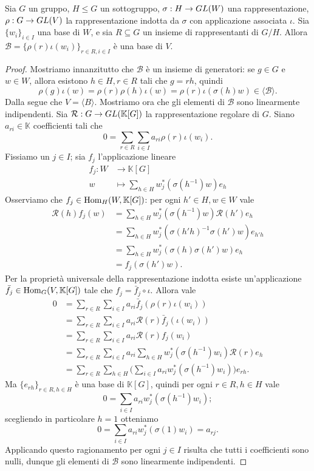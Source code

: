 \begin{proposition}
Sia $G$ un gruppo, $H\le G$ un sottogruppo, $\sigma:H\to GL(W)$ una rappresentazione, $\rho:G\to GL(V)$ la rappresentazione indotta da $\sigma$ con applicazione associata $\iota$. Sia $\{w_i\}_{i\in I}$ una base di $W$, e sia $R\subseteq G$ un insieme di rappresentanti di $G/H$. Allora $\mathcal{B}=\{\rho(r)\iota(w_i)\}_{r\in R,i\in I}$ è una base di $V$.
\end{proposition}
\begin{proof}
Mostriamo innanzitutto che $\mathcal{B}$ è un insieme di generatori: se $g\in G$ e $w\in W$, allora esistono $h\in H\comma r\in R$ tali che $g=rh$, quindi 
$$
\rho(g)\iota(w)=\rho(r)\rho(h)\iota(w)=\rho(r)\iota(\sigma(h)w)\in\langle\mathcal{B}\rangle.
$$
Dalla  segue che $V=\langle B\rangle$. Mostriamo ora che gli elementi di $\mathcal{B}$ sono linearmente indipendenti. Sia $\mathcal{R}:G\to GL(\mathbb{K}[G])$ la rappresentazione regolare di $G$. Siano $a_{ri}\in\mathbb{K}$ coefficienti tali che
$$
0=\sum_{r\in R}\sum_{i\in I}a_{ri}\rho(r)\iota(w_i).
$$
Fissiamo un $j\in I$; sia $f_j$ l'applicazione lineare
\begin{align*}
f_j:W&\longrightarrow\mathbb{K}[G]\\
w&\longmapsto\sum_{h\in H}w_j^*(\sigma(h^{-1})w)e_h
\end{align*}
Osserviamo che $f_j\in\operatorname{Hom}_H(W,\mathbb{K}[G])$: per ogni $h'\in H\comma w\in W$ vale
\begin{align*}
\mathcal{R}(h)f_j(w)&=\sum_{h\in H}w_j^*(\sigma(h^{-1})w)\mathcal{R}(h')e_h\\
&=\sum_{h\in H}w_j^*(\sigma(h'h)^{-1}\sigma(h')w)e_{h'h}\\
&=\sum_{h\in H}w_j^*(\sigma(h)\sigma(h')w)e_h\\
&=f_j(\sigma(h')w).
\end{align*}
Per la proprietà universale della rappresentazione indotta esiste un'applicazione $\bar{f}_j\in\operatorname{Hom}_G(V,\mathbb{K}[G])$ tale che $f_j=\bar{f}_j\circ\iota$. Allora vale
\begin{align*}
0&=\sum_{r\in R}\sum_{i\in I}a_{ri}\bar{f}_j(\rho(r)\iota(w_i))\\
&=\sum_{r\in R}\sum_{i\in I}a_{ri}\mathcal{R}(r)\bar{f}_j(\iota(w_i))\\
&=\sum_{r\in R}\sum_{i\in I}a_{ri}\mathcal{R}(r)f_j(w_i)\\
&=\sum_{r\in R}\sum_{i\in I}a_{ri}\sum_{h\in H}w_j^*(\sigma(h^{-1})w_i)\mathcal{R}(r)e_h\\
&=\sum_{r\in R}\sum_{h\in H}\biggl(\sum_{i\in I}a_{ri}w_j^*(\sigma(h^{-1})w_i)\biggr)e_{rh}.
\end{align*}
Ma $\{e_{rh}\}_{r\in R,h\in H}$ è una base di $\mathbb{K}[G]$, quindi per ogni $r\in R\comma h\in H$ vale
$$
0=\sum_{i\in I}a_{ri}w_j^*(\sigma(h^{-1})w_i);
$$
scegliendo in particolare $h=1$ otteniamo
$$
0=\sum_{i\in I}a_{ri}w_j^*(\sigma(1)w_i)=a_{rj}.
$$
Applicando questo ragionamento per ogni $j\in I$ risulta che tutti i coefficienti sono nulli, dunque gli elementi di $\mathcal{B}$ sono linearmente indipendenti.
\end{proof}


